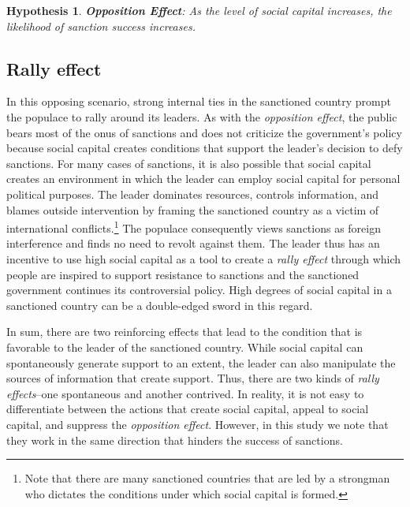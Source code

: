 \documentclass[12pt,]{article}
\newtheorem{hyp}{Hypothesis}
\begin{document}
\begin{hyp}\label{opposition} {\bf Opposition Effect}: As the level of social capital increases, the likelihood of sanction success increases.\end{hyp}

\hypertarget{rally-effect}{%
\subsection{Rally effect}\label{rally-effect}}

In this opposing scenario, strong internal ties in the sanctioned
country prompt the populace to rally around its leaders. As with the
\emph{opposition effect}, the public bears most of the onus of sanctions
and does not criticize the government's policy because social capital
creates conditions that support the leader's decision to defy sanctions.
For many cases of sanctions, it is also possible that social capital
creates an environment in which the leader can employ social capital for
personal political purposes. The leader dominates resources, controls
information, and blames outside intervention by framing the sanctioned
country as a victim of international conflicts.\footnote{Note that there
  are many sanctioned countries that are led by a strongman who dictates
  the conditions under which social capital is formed.} The populace
consequently views sanctions as foreign interference and finds no need
to revolt against them. The leader thus has an incentive to use high
social capital as a tool to create a \emph{rally effect} through which
people are inspired to support resistance to sanctions and the
sanctioned government continues its controversial policy. High degrees
of social capital in a sanctioned country can be a double-edged sword in
this regard.

In sum, there are two reinforcing effects that lead to the condition
that is favorable to the leader of the sanctioned country. While social
capital can spontaneously generate support to an extent, the leader can
also manipulate the sources of information that create support. Thus,
there are two kinds of \emph{rally effects}--one spontaneous and another
contrived. In reality, it is not easy to differentiate between the
actions that create social capital, appeal to social capital, and
suppress the \emph{opposition effect}. However, in this study we note
that they work in the same direction that hinders the success of
sanctions.
\end{document}
